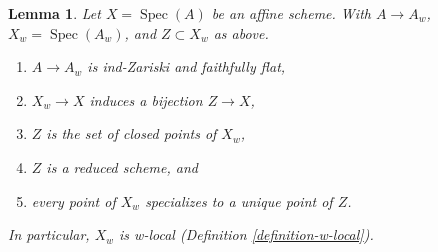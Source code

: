 \documentclass[10pt,a4paper]{article}
\theoremstyle{plain}
\newtheorem{lemma}[subsection]{Lemma}
\theoremstyle{definition}
\theoremstyle{remark}
\numberwithin{equation}{subsection}
\def\Spec{\mathop{\mathrm{Spec}}}
\begin{document}
\begin{lemma}
\label{lemma-make-w-local}
Let $X = \Spec(A)$ be an affine scheme. With $A \to A_w$, $X_w = \Spec(A_w)$,
and $Z \subset X_w$ as above.
\begin{enumerate}
\item $A \to A_w$ is ind-Zariski and faithfully flat,
\item $X_w \to X$ induces a bijection $Z \to X$,
\item $Z$ is the set of closed points of $X_w$,
\item $Z$ is a reduced scheme, and
\item every point of $X_w$ specializes to a unique point of $Z$.
\end{enumerate}
In particular, $X_w$ is w-local (Definition \ref{definition-w-local}).
\end{lemma}
\end{document}
